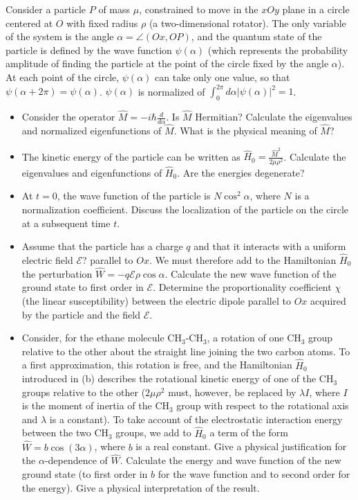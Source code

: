 \documentclass[10pt,a4paper]{article}
\newenvironment{problem}[2][Problem]{\begin{trivlist}
\item[\hskip \labelsep {\bfseries #1}\hskip \labelsep {\bfseries #2.}]}{\end{trivlist}}
\begin{document}
\begin{problem}{3}
[C-T Exercise 11-4] Consider a particle $P$ of mass $\mu$, constrained to move in the $xOy$ plane in a circle centered at $O$ with fixed radius $\rho$ (a  two-dimensional rotator). The only variable of the system is the angle $\alpha=\angle(Ox,OP)$, and the quantum state of the particle is defined by the wave function $\psi(\alpha)$ (which represents the probability amplitude of finding the particle at the point of the circle fixed by the angle $\alpha$). At each point of the circle, $\psi(\alpha)$ can take only one value, so that $\psi(\alpha+2\pi)=\psi(\alpha)$. $\psi(\alpha)$ is normalized of $\int_0^{2\pi}d\alpha|\psi(\alpha)|^2=1$.
\begin{itemize}
\item[(a)] Consider the operator $\hat{M}=-i\hbar\frac{d}{d\alpha}$. Is $\hat{M}$ Hermitian? Calculate the eigenvalues and normalized eigenfunctions of $\hat{M}$. What is the physical meaning of $\hat{M}$?
\item[(b)] The kinetic energy of the particle can be written as $\hat{H}_0=\frac{\hat{M}^2}{2\mu\rho^2}$. Calculate the eigenvalues and eigenfunctions of $\hat{H}_0$. Are the energies degenerate?
\item[(c)] At $t=0$, the wave function of the particle is $N\cos^2\alpha$, where $N$ is a normalization coefficient. Discuss the localization of the particle on the circle at a subsequent time $t$.
\item[(d)] Assume that the particle has a charge $q$ and that it interacts with a uniform electric field $\mathscr{E}$? parallel to $Ox$. We must therefore add to the Hamiltonian $\hat{H}_0$ the perturbation $\hat{W}=-q\mathscr{E}\rho\cos\alpha$. Calculate the new wave function of the ground state to first order in $\mathscr{E}$. Determine the proportionality coefficient $\chi$ (the linear susceptibility) between the electric dipole parallel to $Ox$ acquired by the particle and the field $\mathscr{E}$.
\item[(e)] Consider, for the ethane molecule CH$_3$-CH$_3$, a rotation of one CH$_3$ group relative to the other about the straight line joining the two carbon atoms. To a first approximation, this rotation is free, and the Hamiltonian $\hat{H}_0$ introduced in (b) describes the rotational kinetic energy of one of the CH$_3$ groups relative to the other ($2\mu\rho^2$ must, however, be replaced by $\lambda I$, where $I$ is the moment of inertia of the CH$_3$ group with respect to the rotational axis and $\lambda$ is a constant). To take account of the electrostatic interaction energy between the two CH$_3$ groups, we add to $\hat{H}_0$ a term of the form $\hat{W}=b\cos(3\alpha)$, where $b$ is a real constant. Give a physical justification for the $\alpha$-dependence of $\hat{W}$. Calculate the energy and wave function of the new ground state (to first order in $b$ for the wave function and to second order for the energy). Give a physical interpretation of the result.
\end{itemize}
\end{problem}
\end{document}
